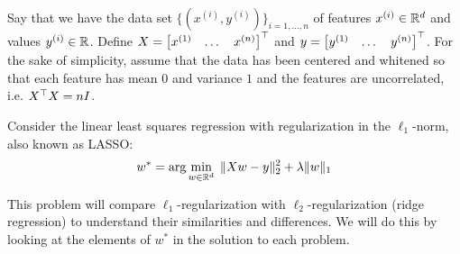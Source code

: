 \rm

Say that we have the data set $\{ (x^{(i)}, y^{(i)}) \}_{i=1,\dots, n}$ of features $x^{(i)} \in \mathbb{R}^{d}$ and values $y^{(i)} \in \mathbb{R}^{}$. Define $X = \begin{bmatrix} {x^{(1)}} & \dots & {x^{(n)}} \end{bmatrix}^{\top}$ and $y = \begin{bmatrix} y^{(1)} & \dots & y^{(n)} \end{bmatrix}^{\top}$.
For the sake of simplicity, assume that the data
has been centered and whitened so that
each feature has mean $0$ and variance $1$ and the features are uncorrelated, i.e. $X^{\top} X = n I$.

Consider the linear least squares regression with regularization in the $\ell_1$-norm, also known as LASSO:
\[w^* = \arg \min_{w \in \mathbb{R}^{d}} \; \|X w - y\|_2^2 + \lambda \|w\|_1\]

This problem will compare $\ell_1$-regularization with $\ell_2$-regularization (ridge regression) to understand their similarities and differences. We will do this by looking at the elements of $w^*$ in the solution to each problem.

